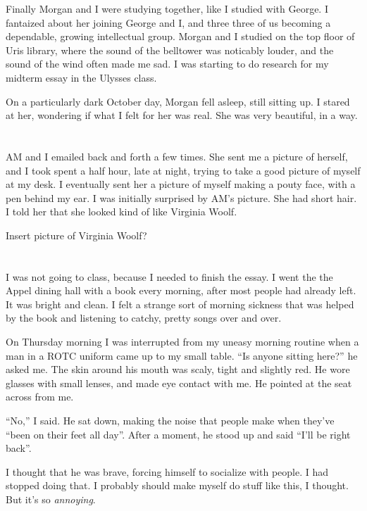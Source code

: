 Finally Morgan and I were studying together, like I studied with George.  I
fantaized about her joining George and I, and three three of us becoming a
dependable,  growing intellectual group.  Morgan and I studied on the top floor
of Uris library, where the sound of the belltower was noticably louder, and the
sound of the wind often made me sad.  I was starting to do research for my
midterm essay in the Ulysses class.  

On a particularly dark October day, Morgan fell asleep, still sitting up.  I
stared at her, wondering if what I felt for her was real.  She was very
beautiful, in a way.  

\section{}

AM and I emailed back and forth a few times.  She sent me a picture of herself,
and I took spent a half hour, late at night, trying to take a good picture of
myself at my desk.  I eventually sent her a picture of myself making a pouty
face, with a pen behind my ear.  I was initially surprised by AM's picture.  She
had short hair.  I told her that she looked kind of like Virginia Woolf.  

Insert picture of Virginia Woolf?

\section{}

I was not going to class, because I needed to finish the essay.  I went the the
Appel dining hall with a book every morning, after most people had already left.
It was bright and clean.  I felt a strange sort of morning sickness that was
helped by the book and listening to catchy, pretty songs over and over.  

On Thursday morning I was interrupted from my uneasy morning routine when a man
in a ROTC uniform came up to my small table.  ``Is anyone sitting here?'' he
asked me.  The skin around his mouth was scaly, tight and slightly red.  He wore
glasses with small lenses, and made eye contact with me.  He pointed at the seat
across from me.  

``No,'' I said.  He sat down, making the noise that people make when they've
``been on their feet all day''.  After a moment, he stood up and said ``I'll be
right back''.  

I thought that he was brave, forcing himself to socialize with people.  I had
stopped doing that.  I probably should make myself do stuff like this, I
thought.  But it's so \textit{annoying}. 

